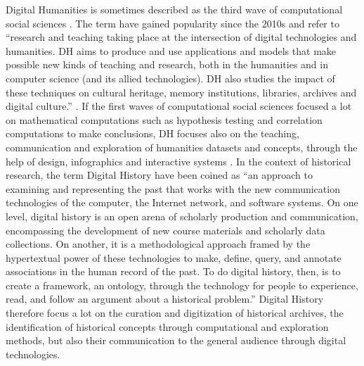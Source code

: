 Digital Humanities is sometimes described as the third wave of computational social sciences \cite{lemercierQuantitativeMethodsHumanities2019}.
The term have gained popularity since the 2010s and refer to ``research and teaching taking place at the intersection of digital technologies and humanities. DH aims to
produce and use applications and models that make possible new kinds of teaching and research, both in the humanities and
in computer science (and its allied technologies). DH also studies the impact of these techniques on cultural heritage,
memory institutions, libraries, archives and digital culture.'' \cite{terras2011quantifying}.
If the first waves of computational social sciences focused a lot on mathematical computations such as hypothesis testing and correlation computations to make conclusions, DH focuses also on the teaching, communication and exploration of humanities datasets and concepts, through the help of design, infographics and interactive systems \cite{burdickDigitalHumanities2016}.
In the context of historical research, the term Digital History have been coined as ``an approach to examining and representing the past that works with the new communication technologies of the computer, the Internet network, and software systems. On one level, digital history is an open arena of scholarly production and communication, encompassing the development of new course materials and scholarly data collections. On another, it is a methodological approach framed by the hypertextual power of these technologies to make, define, query, and annotate associations in the human record of the past. To do digital history, then, is to create a framework, an ontology, through the technology for people to experience, read, and follow an argument about a historical problem.'' \cite{InterchangePromiseDigital2008}
Digital History therefore focus a lot on the curation and digitization of historical archives, the identification of historical concepts through computational and exploration methods, but also their communication to the general audience through digital technologies.

